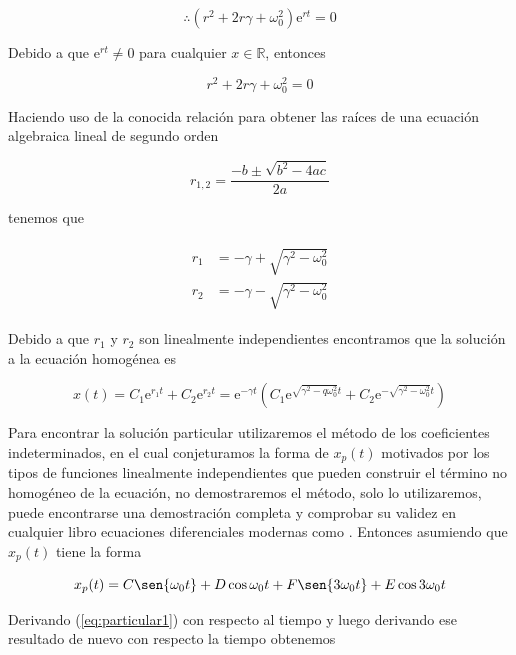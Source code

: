 \documentclass[a4paper,10pt]{article}
\numberwithin{equation}{section}
\newcommand{\euler}{\mathrm{e}}
\begin{document}
$$
\therefore \left(r^2 + 2r\gamma + \omega_0^2\right) \euler^{rt} = 0
$$

Debido a que $\euler^{rt} \neq 0$ para cualquier $x \in \mathbb{R}$, entonces

\begin{equation}
  r^2 + 2r\gamma + \omega_0^2 = 0
 \label{eq:ecuacionCaracteristica1}
\end{equation}

Haciendo uso de la conocida relación para obtener las raíces de una ecuación
algebraica lineal de segundo orden

$$
r_{1,2} = \frac{-b \pm \sqrt{b^2-4ac}}{2a}
$$

tenemos que 

\begin{align}
\begin{split}
%
r_1 &= - \gamma + \sqrt{\gamma^2 - \omega_0^2} \\
%
r_2 &= - \gamma - \sqrt{\gamma^2 - \omega_0^2}
%
\end{split}
\end{align}

Debido a que $r_1$ y $r_2$ son linealmente independientes encontramos que la solución
a la ecuación homogénea es 

\begin{equation}
 x(t) = C_1 \euler^{r_1 t} + C_2 \euler^{r_2 t} = \euler^{-\gamma t} (C_1 \euler^{\sqrt{\gamma^2 -q \omega_0^2}t}
 + C_2 \euler^{-\sqrt{\gamma^2 - \omega_0^2}t})
\end{equation}

Para encontrar la solución particular utilizaremos el método de los coeficientes indeterminados, 
en el cual conjeturamos la forma de $x_p (t)$ motivados por los tipos de funciones linealmente
independientes que pueden construir el término no homogéneo de la ecuación, no demostraremos
el método, solo lo utilizaremos, puede encontrarse una demostración completa y comprobar
su validez en cualquier libro ecuaciones diferenciales modernas como \cite{zill}. Entonces
asumiendo que $x_p (t)$ tiene la forma

\begin{equation}
 x_p (t) = C \sen{\omega_0t} + D \cos{\omega_0t} + F \sen{3 \omega_0t} + E \cos{3 \omega_0t}
 \label{eq:particular1}
\end{equation}

Derivando (\ref{eq:particular1}) con respecto al tiempo y luego derivando ese resultado de nuevo
con respecto la tiempo obtenemos
\end{document}
